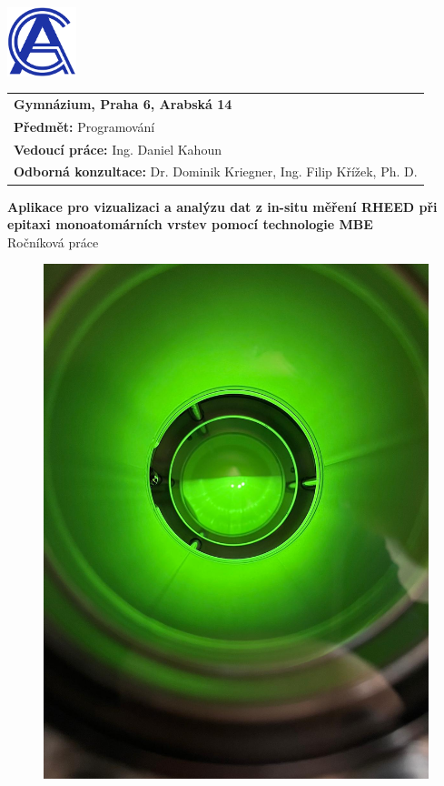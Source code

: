 \documentclass[a4paper,11pt]{article}
\begin{document}
	\thispagestyle{empty}
	
	\begin{flushleft}
		\includegraphics[width=2cm]{logo.png}
		\begin{tabular}[b]{@{}p{}}
			\large\textbf{Gymnázium, Praha 6, Arabská 14}\\
			\textbf{Předmět:} Programování\\
			\textbf{Vedoucí práce:} Ing. Daniel Kahoun\\
			\textbf{Odborná konzultace:} Dr. Dominik Kriegner, Ing. Filip Křížek, Ph. D. 
		\end{tabular}
	\end{flushleft}
	
	\begin{center}
		\vspace{1cm}
		{\Huge\textbf{Aplikace pro vizualizaci a analýzu dat z in-situ měření RHEED při epitaxi monoatomárních vrstev pomocí technologie MBE}}\\
		\vspace{0.5cm}
		Ročníková práce
		\vspace{0.5cm}
	\end{center}
	
	\begin{figure}[H]
		\centering
		\includegraphics[width=0.60 \textwidth]{title.png}
	\end{figure}
	
\end{document}
